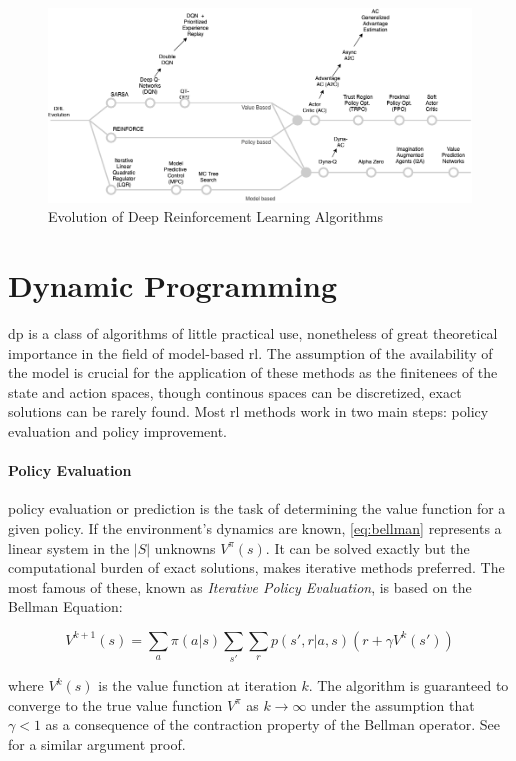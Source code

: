 \begin{figure}
    \centering
    \includegraphics[scale=.35]{images/drl-algorithm-evolution.png}
    \caption{Evolution of Deep Reinforcement Learning Algorithms}
    \label{fig:drl-algorithm-evolution}
\end{figure}

\section{Dynamic Programming}
\gls{dp} is a class of algorithms of little practical use, nonetheless of great theoretical 
importance in the field of model-based \gls{rl}. The assumption of the availability of the model is 
crucial for the application of these methods as the finitenees of the state and action spaces, though 
continous spaces can be discretized, exact solutions can be rarely found. 
Most \gls{rl} methods work in two main steps: policy evaluation and policy improvement.

\paragraph{Policy Evaluation} policy evaluation or prediction is the task of determining 
the value function for a given policy. If the environment's dynamics are known, \cref{eq:bellman} represents 
a linear system in the $|S|$ unknowns $V^{\pi}(s)$. It can be solved exactly but 
the computational burden of exact solutions, makes iterative methods preferred. 
The most famous of these, known as \textit{Iterative Policy Evaluation}, is based on the Bellman Equation:

$$V^{k+1}(s) = \sum_{a}\pi(a|s)\sum_{s'}\sum_{r}p(s',r|a, s)(r+\gamma V^{k}(s'))$$

where $V^{k}(s)$ is the value function at iteration $k$. The algorithm is guaranteed to converge to the 
true value function $V^{\pi}$ as $k \rightarrow \infty$ under the assumption that $\gamma < 1$ as a 
consequence of the contraction property of the Bellman operator. See  for 
a similar argument proof.

